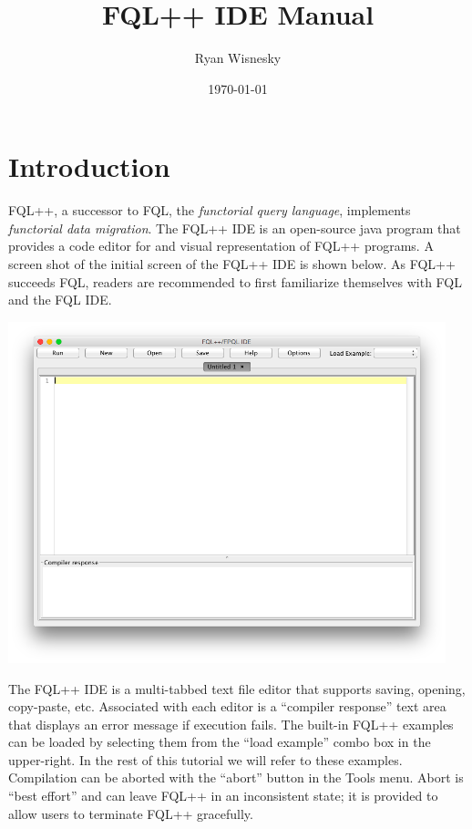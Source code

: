 \documentclass[12pt]{article}
\begin{document}
\title{FQL++ IDE Manual}
\author{Ryan Wisnesky}
\date{\today}

\maketitle

\vspace{-0.5in}

\begin{footnotesize}
\tableofcontents
\end{footnotesize}
\newpage

\section{Introduction}

FQL++, a successor to FQL, the {\it functorial query language}, implements {\it functorial data migration}.  The FQL++ IDE is an open-source java program that provides a code editor for and visual representation of FQL++ programs.  A screen shot of the initial screen of the FQL++ IDE is shown below.  As FQL++ succeeds FQL, readers are recommended to first familiarize themselves with FQL and the FQL IDE.

\begin{center}
\includegraphics[width=5in]{initial}
\end{center}

The FQL++ IDE is a multi-tabbed text file editor that supports saving, opening, copy-paste, etc.  Associated with each editor is a ``compiler response'' text area that displays an error message if execution fails.  The built-in FQL++ examples can be loaded by selecting them from the ``load example'' combo box in the upper-right.  In the rest of this tutorial we will refer to these examples.  Compilation can be aborted with the ``abort'' button in the Tools menu.  Abort is ``best effort'' and can leave FQL++ in an inconsistent state; it is provided to allow users to terminate FQL++ gracefully.  
\end{document}
